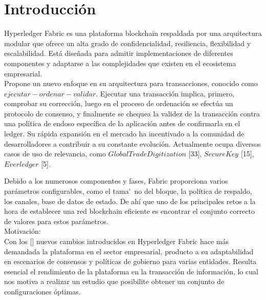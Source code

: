 \chapter*{Introducción}\label{chapter:introduction}

Hyperledger Fabric es una plataforma blockchain respaldada por una arquitectura modular que ofrece un alta grado de confidencialidad, resiliencia, flexibilidad y escalabilidad. Est\'a dise\~nada para admitir implementaciones de diferentes componentes y adaptarse a las complejidades que existen en el ecosistema empresarial.\\

Propone un nuevo enfoque en su arquitectura para transacciones, conocido como $ejecutar-ordenar-validar$. Ejecutar una transacci\'on implica, primero, comprobar su correcci\'on, luego en el proceso de ordenaci\'on se efect\'ua un protocolo de consenso, y finalmente se chequea la validez de la transacci\'on contra una pol\'itica de endoso espec\'ifica de la aplicaci\'on antes de confirmarla en el ledger. Su r\'apida expansi\'on en el mercado ha incentivado a la comunidad de desarrolladores a contribuir a su constante evoluci\'on. Actualmente ocupa diversos casos de uso de relevancia, como $Global Trade Digitization$ [33], $SecureKey$ [15], $Everledger$ [5]. 



Debido a los numerosos componentes y fases, Fabric proporciona varios par\'ametros configurables, como el tama\'~no del bloque, la pol\'itica de respaldo, los canales, base de datos de estado. De ah\'i que uno de los principales retos a la hora de establecer una red blockchain eficiente es encontrar el conjunto correcto de valores para estos par\'ametros.\\

Motivaci\'on:\\

Con los [\cite{watson53}] nuevos cambios introducidos en Hyperledger Fabric hace m\'as demandada la plataforma en el sector empresarial, producto a su adaptabilidad en escenarios de consensos y pol\'iticas de gobierno para varias entidades. Resulta esencial el rendimiento de la plataforma en la transacci\'on de informaci\'on, lo cual nos motiva a realizar un estudio que posibilite obtener un conjunto de configuraciones \'optimas.
